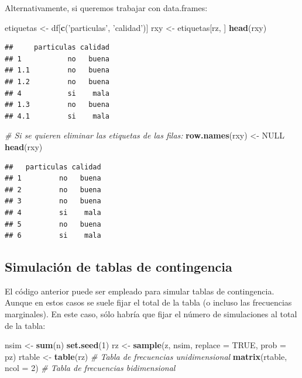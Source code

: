\documentclass[
]{book}
\newenvironment{Shaded}{\begin{snugshade}}{\end{snugshade}}
\newcommand{\CommentTok}[1]{\textcolor[rgb]{0.56,0.35,0.01}{\textit{#1}}}
\newcommand{\DataTypeTok}[1]{\textcolor[rgb]{0.13,0.29,0.53}{#1}}
\newcommand{\DecValTok}[1]{\textcolor[rgb]{0.00,0.00,0.81}{#1}}
\newcommand{\KeywordTok}[1]{\textcolor[rgb]{0.13,0.29,0.53}{\textbf{#1}}}
\newcommand{\NormalTok}[1]{#1}
\newcommand{\OtherTok}[1]{\textcolor[rgb]{0.56,0.35,0.01}{#1}}
\newcommand{\StringTok}[1]{\textcolor[rgb]{0.31,0.60,0.02}{#1}}
\theoremstyle{break}
\theoremstyle{definition}
\theoremstyle{definition}
\theoremstyle{definition}
\theoremstyle{remark}
\begin{document}
Alternativamente, si queremos trabajar con data.frames:

\begin{Shaded}
\begin{Highlighting}[]
\NormalTok{etiquetas <-}\StringTok{ }\NormalTok{df[}\KeywordTok{c}\NormalTok{(}\StringTok{'particulas'}\NormalTok{, }\StringTok{'calidad'}\NormalTok{)]}
\NormalTok{rxy <-}\StringTok{ }\NormalTok{etiquetas[rz, ]}
\KeywordTok{head}\NormalTok{(rxy)}
\end{Highlighting}
\end{Shaded}

\begin{verbatim}
##     particulas calidad
## 1           no   buena
## 1.1         no   buena
## 1.2         no   buena
## 4           si    mala
## 1.3         no   buena
## 4.1         si    mala
\end{verbatim}

\begin{Shaded}
\begin{Highlighting}[]
\CommentTok{# Si se quieren eliminar las etiquetas de las filas:}
\KeywordTok{row.names}\NormalTok{(rxy) <-}\StringTok{ }\OtherTok{NULL}
\KeywordTok{head}\NormalTok{(rxy)}
\end{Highlighting}
\end{Shaded}

\begin{verbatim}
##   particulas calidad
## 1         no   buena
## 2         no   buena
## 3         no   buena
## 4         si    mala
## 5         no   buena
## 6         si    mala
\end{verbatim}

\hypertarget{simconting}{%
\subsection{Simulación de tablas de contingencia}\label{simconting}}

El código anterior puede ser empleado para simular tablas de contingencia.
Aunque en estos casos se suele fijar el total de la tabla (o incluso las frecuencias marginales).
En este caso, sólo habría que fijar el número de simulaciones al total de la tabla:

\begin{Shaded}
\begin{Highlighting}[]
\NormalTok{nsim <-}\StringTok{ }\KeywordTok{sum}\NormalTok{(n)}
\KeywordTok{set.seed}\NormalTok{(}\DecValTok{1}\NormalTok{)}
\NormalTok{rz <-}\StringTok{ }\KeywordTok{sample}\NormalTok{(z, nsim, }\DataTypeTok{replace =} \OtherTok{TRUE}\NormalTok{, }\DataTypeTok{prob =}\NormalTok{ pz)}
\NormalTok{rtable <-}\StringTok{ }\KeywordTok{table}\NormalTok{(rz) }\CommentTok{# Tabla de frecuencias unidimensional}
\KeywordTok{matrix}\NormalTok{(rtable, }\DataTypeTok{ncol =} \DecValTok{2}\NormalTok{) }\CommentTok{# Tabla de frecuencias bidimensional}
\end{Highlighting}
\end{Shaded}
\end{document}
